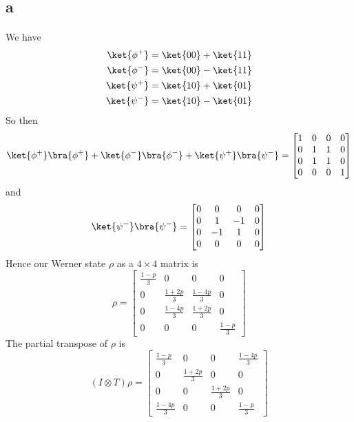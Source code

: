 \documentclass[letterpaper,12pt,oneside,onecolumn]{article}
\begin{document}
\section{}
\subsection{a}
\paragraph{}
We have
\begin{align*}
\ket{\phi^+} &= \ket{00} + \ket{11}\\
\ket{\phi^-} &= \ket{00} - \ket{11} \\
\ket{\psi^+} &= \ket{10} + \ket{01} \\
\ket{\psi^-} &= \ket{10} - \ket{01}
\end{align*}
So then
$$\ket{\phi^+}\bra{\phi^+} + \ket{\phi^-}\bra{\phi^-} + \ket{\psi^+}\bra{\psi^-} = \begin{bmatrix}
1 & 0 & 0 &0 \\
0 & 1 & 1 & 0 \\
0 & 1 & 1 & 0 \\
0 &0 &0 &1
\end{bmatrix}$$
and 
$$\ket{\psi^-}\bra{\psi^-} = \begin{bmatrix}
0 & 0 &0 & 0\\
0 & 1 & -1 & 0 \\
0 & -1 & 1 & 0 \\
0 &0 &0 &0
\end{bmatrix}$$
Hence our Werner state $\rho$ as a $4\times 4$ matrix is
$$\rho = \begin{bmatrix}
\frac{1-p}{3} & 0 & 0 &0 \\
0 & \frac{1+2p}{3} & \frac{1-4p}{3} & 0 \\
0 & \frac{1-4p}{3} & \frac{1+2p}{3} & 0 \\
0 & 0 & 0 & \frac{1-p}{3}
\end{bmatrix}$$
The partial transpose of $\rho$ is 
$$(I \otimes T)\rho = \begin{bmatrix}
\frac{1-p}{3} & 0 & 0 &\frac{1-4p}{3} \\
0 & \frac{1+2p}{3} & 0 & 0 \\
0 & 0 & \frac{1+2p}{3} & 0 \\
\frac{1-4p}{3} & 0 & 0 & \frac{1-p}{3}
\end{bmatrix}$$
\end{document}
